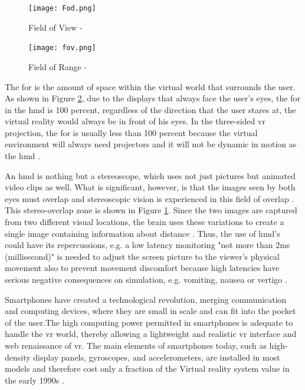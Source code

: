 \begin{figure}[ht]
    \centering
    \texttt{[image: Fod.png]}
    \caption{Field of View - \citep{William}}
    \label{fig:field}
\end{figure}


\begin{figure}[ht]
    \centering
    \texttt{[image: fov.png]}
    \caption{Field of Range - \citep{William}}
    \label{fig:fod}
\end{figure}

The \acrfull{for} is the amount of space within the virtual world that surrounds the user. As shown in Figure \ref{fig:fod}, due to the displays that always face the user's eyes, the \acrshort{for} in the \acrshort{hmd} is 100 percent, regardless of the direction that the user stares at, the virtual reality would always be in front of his eyes. In the three-sided \acrshort{vr} projection, the \acrshort{for} is usually less than 100 percent because the virtual environment will always need projectors and it will not be dynamic in motion as the \acrlong{hmd} \citep{William}.

An \acrshort{hmd} is nothing but a stereoscope, which uses not just pictures but animated video clips as well. What is significant, however, is that the images seen by both eyes must overlap and stereoscopic vision is experienced in this field of overlap \citep{Vince2011}.
This stereo-overlap zone is shown in Figure \ref{fig:field}. Since the two images are captured from two different visual locations, the brain uses these variations to create a single image containing information about distance \citep{Vince2011}. Thus, the use of \acrshort{hmd}'s could have its repercussions, e.g. a low latency monitoring "not more than 2ms (millisecond)" is needed to adjust the screen picture to the viewer's physical movement  also to prevent movement discomfort because high latencies have serious negative consequences on simulation, e.g. vomiting, nausea or vertigo \citep{burdea2017virtual, Vince2011, Steinicke2016}.

Smartphones have created a technological revolution, merging communication and computing devices, where they are small in scale and can fit into the pocket of the user.The high computing power permitted in smartphones is adequate to handle the \acrshort{vr} world, thereby allowing a lightweight and realistic \acrshort{vr} interface and web renaissance of \acrshort{vr}. The main elements of smartphones today, such as high-density display panels, gyroscopes, and accelerometers, are installed in most models and therefore cost only a fraction of the Virtual reality system value in the early 1990s \citep{Steinicke2016}. 



